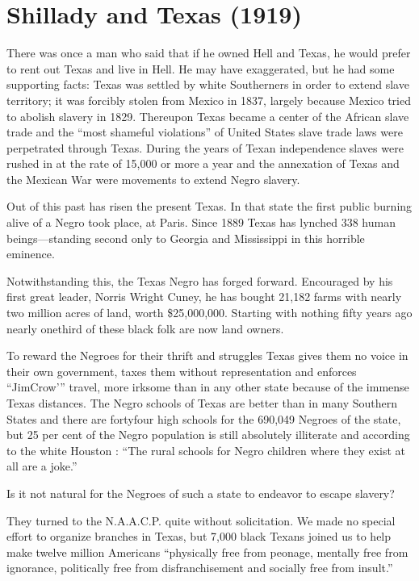 \documentclass[letterpaper,10pt,english]{jupyterBook}
\begin{document}
\section{Shillady and Texas (1919)}
\label{\detokenize{Volumes/18/06/shillady_and_texas:shillady-and-texas-1919}}\label{\detokenize{Volumes/18/06/shillady_and_texas::doc}}
\sphinxAtStartPar
There was once a man who said that if he owned Hell and Texas, he would prefer to rent out Texas and live in Hell. He may have exaggerated, but he had some supporting facts: Texas was settled by white Southerners in order to extend slave territory; it was forcibly stolen from Mexico in 1837, largely because Mexico tried to abolish slavery in 1829. Thereupon Texas became a center of the African slave trade and the “most shameful violations” of United States slave trade laws were perpetrated through Texas. During the years of Texan independence slaves were rushed in at the rate of 15,000 or more a year and the annexation of Texas and the Mexican War were movements to extend Negro slavery.

\sphinxAtStartPar
Out of this past has risen the present Texas. In that state the first public burning alive of a Negro took place, at Paris. Since 1889 Texas has lynched 338 human beings—standing second only to Georgia and Mississippi in this horrible eminence.

\sphinxAtStartPar
Notwithstanding this, the Texas Negro has forged forward. Encouraged by his first great leader, Norris Wright Cuney, he has bought 21,182 farms with nearly two million acres of land, worth \$25,000,000. Starting with nothing fifty years ago nearly one\sphinxhyphen{}third of these black folk are now land owners.

\sphinxAtStartPar
To reward the Negroes for their thrift and struggles Texas gives them no voice in their own government, taxes them without representation and enforces “Jim\sphinxhyphen{}Crow’” travel, more irksome than in any other state because of the immense Texas distances. The Negro schools of Texas are better than in many Southern States and there are forty\sphinxhyphen{}four high schools for the 690,049 Negroes of the state, but 25 per cent of the Negro population is still absolutely illiterate and according to the white Houston : “The rural schools for Negro children where they exist at all are a joke.”

\sphinxAtStartPar
Is it not natural for the Negroes of such a state to endeavor to escape slavery?

\sphinxAtStartPar
They turned to the N.A.A.C.P. quite without solicitation. We made no special effort to organize branches in Texas, but 7,000 black Texans joined us to help make twelve million Americans “physically free from peonage, mentally free from ignorance, politically free from disfranchisement and socially free from insult.”
\end{document}
